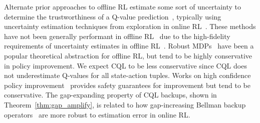 Alternate prior approaches to offline RL estimate some sort of uncertainty to determine the trustworthiness of a Q-value prediction~\citep{kumar2019stabilizing,agarwal2019optimistic,levine2020offline}, typically using uncertainty estimation techniques from exploration in online RL~\citep{osband2016deep,jaksch2010near,osband2017posterior,burda2018exploration}. These methods have not been generally performant in offline RL~\citep{fujimoto2018off,kumar2019stabilizing,levine2020offline} due to the high-fidelity requirements of uncertainty estimates in offline RL~\citep{levine2020offline}. Robust MDPs~\citep{iyengar2005robust,ghavamzadeh2016safe,tamar2014scaling,nilim2004robustness} have been a popular theoretical abstraction for offline RL, but tend to be highly conservative in policy improvement. We expect CQL to be less conservative since CQL does not underestimate Q-values for all state-action tuples. Works on high confidence policy improvement~\citep{thomas2015high} provides safety guarantees for improvement but tend to be conservative. The gap-expanding property of CQL backups, shown in Theorem~\ref{thm:gap_amplify}, is related to how gap-increasing Bellman backup operators~\citep{bellemare2016increasing,lu2018general} are more robust to estimation error in online RL. 

